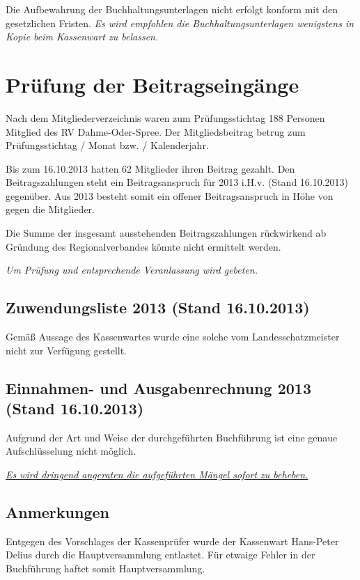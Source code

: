 \documentclass[%
	titlepage,oneside,12pt,headlines=1.5,numbers=noenddot, chapterprefix=false,parskip=full-,DIV=14,pagesize]{scrreprt}
\begin{document}
Die Aufbewahrung der Buchhaltungsunterlagen nicht erfolgt konform mit den gesetzlichen Fristen.\newline
\textit{Es wird empfohlen die Buchhaltungsunterlagen wenigstens in Kopie beim Kassenwart zu belassen.}

\section{Prüfung der Beitragseingänge}
Nach dem Mitgliederverzeichnis waren zum Prüfungsstichtag 188 Personen Mitglied des RV Dahme-Oder-Spree. Der Mitgliedsbeitrag betrug zum Prüfungsstichtag  / Monat bzw.  / Kalenderjahr.

Bis zum 16.10.2013 hatten 62 Mitglieder ihren Beitrag gezahlt. Den Beitragszahlungen steht ein Beitragsanspruch für 2013 i.H.v.  (Stand 16.10.2013) gegenüber. Aus 2013 besteht somit ein offener Beitragsanspruch in Höhe von  gegen die Mitglieder. 

Die Summe der insgesamt ausstehenden Beitragszahlungen rückwirkend ab Gründung des Regionalverbandes könnte nicht ermittelt werden.

\textit{Um Prüfung und entsprechende Veranlassung wird gebeten.}

\subsection{Zuwendungsliste 2013 (Stand 16.10.2013)}
Gemäß Aussage des Kassenwartes wurde eine solche vom Landesschatzmeister nicht zur Verfügung gestellt.

\subsection{Einnahmen- und Ausgabenrechnung 2013 (Stand 16.10.2013)}
Aufgrund der Art und Weise der durchgeführten Buchführung ist eine genaue Aufschlüsselung nicht möglich.

\textit{\underline{Es wird dringend angeraten die aufgeführten Mängel sofort zu beheben.}}

\subsection{Anmerkungen}
Entgegen des Vorschlages der Kassenprüfer wurde der Kassenwart Hans-Peter Delius durch die Hauptversammlung entlastet. Für etwaige Fehler in der Buchführung haftet somit Hauptversammlung.
\end{document}
